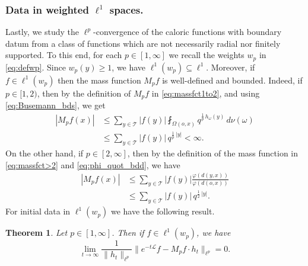 \documentclass[11pt,a4paper,reqno]{amsart}
\renewcommand\mathcal{\mathscr}
\theoremstyle{plain}
\newtheorem{theorem}{Theorem}[section]
\theoremstyle{remark}
\theoremstyle{definition}
\theoremstyle{remark}
\numberwithin{equation}{section}
\begin{document}
\subsubsection{Data in weighted $\ell^1$ spaces.} Lastly, we study the $\ell^p$-convergence of the caloric functions with boundary datum from a class of functions which are not 
necessarily radial nor finitely supported. To this end, for each $p \in [1, \infty]$ we recall the weights $w_p$ in \eqref{eq:defwp}. Since $w_p(y) \geqslant 1$, we have $\ell^1(w_p)\subseteq \ell^1$.
Moreover, if $f \in \ell^1(w_p)$ then the mass function $M_pf$ is well-defined and bounded.  Indeed, if $p \in [1, 2)$, then by the definition of $M_pf$ in \eqref{eq:massfct1to2}, and using \eqref{eq:Busemann_bds}, we get
\begin{align*}
	|M_pf(x)|
	&\leq
	\sum_{y\in \mathcal{T}} |f(y)| 
	\fint_{\Omega(o,x)} q^{\frac{1}{p} \, h_{\omega}(y)} \, d\nu(\omega) \\
		&\leq \sum_{y\in \mathcal{T}} |f(y)|\, q^{\frac{1}{p} \,{|y|} } < \infty.
	\end{align*}
	On the other hand, if $p \in [2, \infty]$, then by the definition of the mass function in \eqref{eq:massfct>2} and \eqref{eq:phi_quot_bdd}, we have
	\begin{align*}
		|M_pf(x)|
		&\leq
		\sum_{y \in \mathcal{T}} |f(y)| \frac{\varphi(d(y, x))}{\varphi(d(o, x))} \\
		&\leq
		\sum_{y\in \mathcal{T}} |f(y)|\, q^{\frac{1}{2} \,{|y|} }.
	\end{align*}
	For initial data in $\ell^1(w_p)$ we have the following result.
	\begin{theorem}
		\label{thm:10}
		Let $p \in [1, \infty]$. Then if $f \in \ell^1(w_p)$, we have
		\[
		\lim_{t \to \infty}
		\frac{1}{\|h_t \|_{\ell^p}}
		\big\|e^{-t\mathcal{L}}f-M_pf \cdot h_t\|_{\ell^p} = 0.
		\]
	\end{theorem}
\end{document}
